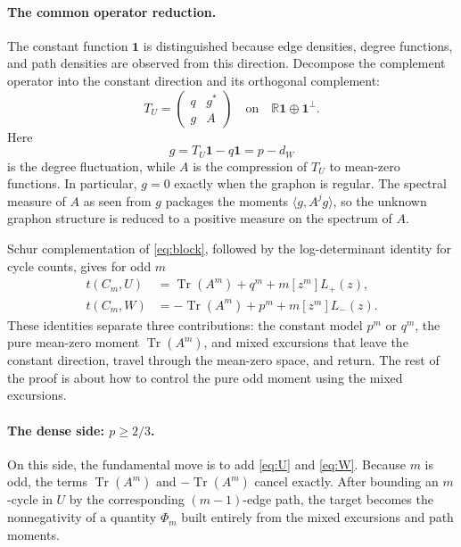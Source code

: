\documentclass[10pt]{article}
\newcommand{\one}{\mathbf 1}
\newcommand{\ip}[2]{\langle #1,#2\rangle}
\newcommand{\Tr}{\operatorname{Tr}}
\begin{document}
\paragraph{The common operator reduction.}
The constant function $\one$ is distinguished because edge densities, degree functions, and path densities are observed from this direction.  Decompose the complement operator into the constant direction and its orthogonal complement:
\begin{equation}\label{eq:block}
  T_U=
  \begin{pmatrix}
    q&g^*\\
    g&A
  \end{pmatrix}
  \quad\text{on}\quad
  \mathbb R\one\oplus\one^\perp.
\end{equation}
Here
\[
  g=T_U\one-q\one=p-d_W
\]
is the degree fluctuation, while $A$ is the compression of $T_U$ to mean-zero functions.  In particular, $g=0$ exactly when the graphon is regular.  The spectral measure of $A$ as seen from $g$ packages the moments $\ip{g}{A^jg}$, so the unknown graphon structure is reduced to a positive measure on the spectrum of $A$.

Schur complementation of \eqref{eq:block}, followed by the log-determinant identity for cycle counts, gives for odd $m$
\begin{align}
  t(C_m,U)&=\Tr(A^m)+q^m+m[z^m]L_+(z),\label{eq:U}\\
  t(C_m,W)&=-\Tr(A^m)+p^m+m[z^m]L_-(z).\label{eq:W}
\end{align}
These identities separate three contributions: the constant model $p^m$ or $q^m$, the pure mean-zero moment $\Tr(A^m)$, and mixed excursions that leave the constant direction, travel through the mean-zero space, and return.  The rest of the proof is about how to control the pure odd moment using the mixed excursions.

\paragraph{The dense side: $p\ge2/3$.}
On this side, the fundamental move is to add \eqref{eq:U} and \eqref{eq:W}.  Because $m$ is odd, the terms $\Tr(A^m)$ and $-\Tr(A^m)$ cancel exactly.  After bounding an $m$-cycle in $U$ by the corresponding $(m-1)$-edge path, the target becomes the nonnegativity of a quantity $\Phi_m$ built entirely from the mixed excursions and path moments.
\end{document}
